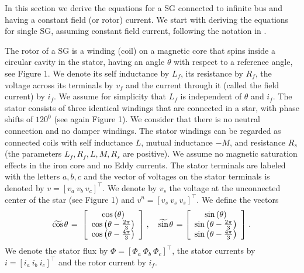 \documentclass[conference]{IEEEtran}
\newcommand{\m}      {{\hbox{\hskip 1pt}}}
\begin{document}
In this section we derive the equations for a SG connected to infinite
bus and having a constant field (or rotor) current. We start with
deriving the equations for single SG, assuming constant field current,
following the notation in \cite{ZhWe:11}. 

The rotor of a SG is a winding (coil) on a magnetic core that spins
inside a circular cavity in the stator, having an angle $\theta$ with
respect to a reference angle, see Figure 1. We denote its self
inductance by $L_f$, its resistance by $R_f$, the voltage across its
terminals by $v_f$ and the current through it (called the field
current) by $i_f$. We assume for simplicity that $L_f$ is independent
of $\theta$ and $i_f$. The stator consists of three identical windings
that are connected in a star, with phase shifts of $120^0$ (see again
Figure 1). We consider that there is no neutral connection and no
damper windings. The stator windings can be regarded as connected
coils with self inductance $L$, mutual inductance $-M$, and resistance
$R_s$ (the parameters $L_f,R_f,L,M,R_s$ are positive). We assume no
magnetic saturation effects in the iron core and no Eddy currents. The
stator terminals are labeled with the letters $a,b,c$ and the vector
of voltages on the stator terminals is denoted by $v=\left[v_a\ v_b\
v_c\right]^\top$. We denote by $v_s$ the voltage at the unconnected 
center of the star (see Figure 1) and $v^n=[v_s\ v_s\ v_s]^\top$.
We define the vectors
$$ \widetilde{\cos}\m\theta \m=\m \left[\begin{array}{c} \cos\left(
   \theta\right)\\ \cos\left(\theta-\frac{2\pi}{3}\right)\\
   \cos\left(\theta-\frac{4\pi}{3}\right) \end{array}\right] \m,\quad
   \widetilde{\sin}\m\theta \m= \left[\begin{array}{c} \sin\left(
   \theta\right)\\ \sin\left(\theta-\frac{2\pi}{3}\right)\\ \sin\left
   (\theta-\frac{4\pi}{3}\right) \end{array}\right] \m.$$
We denote the stator flux by $\Phi=\left[\Phi_a\ \Phi_b\ \Phi_c
\right]^\top$, the stator currents by $i=\left[i_a\ i_b\ i_c\right]
^\top$ and the rotor current by $i_f$. 
\end{document}
